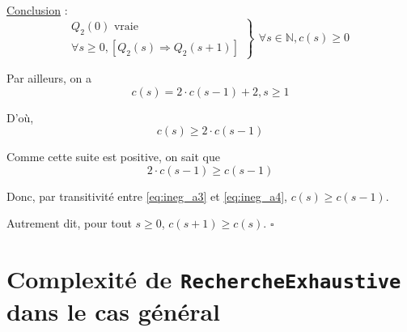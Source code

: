 \documentclass[12pt,a4paper]{article}
\begin{document}
\begin{appendices}
\medskip
\underline{Conclusion} : 
\begin{equation*}
\left .\begin{array}{l}
Q_{2}(0) \text{ vraie } \\
\forall s \geq 0, [Q_{2}(s) \Rightarrow Q_{2}(s+1) ]
\end{array} \right \}
\left .\begin{array}{l}
\forall s \in \mathbb{N}, c(s) \geq 0
\end{array}\right .
\end{equation*}

\bigskip
Par ailleurs, on a 
\begin{equation*}
   c(s) = 2\cdot c(s-1) + 2, s \geq 1
\end{equation*}

D'o\`u,
\begin{equation}
   c(s) \geq 2\cdot c(s-1) \label{eq:ineg_a3}
\end{equation}

Comme cette suite est positive, on sait que 
\begin{equation}
   2\cdot c(s-1) \geq c(s-1) \label{eq:ineg_a4}
\end{equation}

Donc, par transitivit\'e entre \eqref{eq:ineg_a3} et \eqref{eq:ineg_a4}, $c(s) \geq c(s-1)$.

Autrement dit, pour tout $s \geq 0$, $c(s+1) \geq c(s)$. \hfill\ensuremath{\square}

\newpage
\section{Complexit\'e de \texttt{RechercheExhaustive} dans le cas g\'en\'eral}
\label{appendix:rech_gen}

\end{appendices}
	
\printindex
\end{document}
